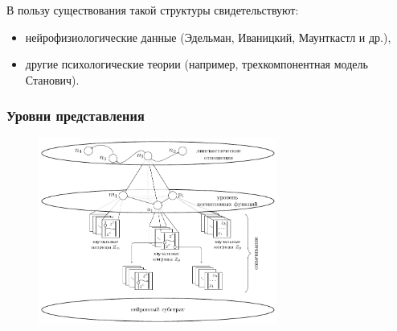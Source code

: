 \documentclass[default]{beamer}
\begin{document}
\begin{frame}
		{\footnotesize
		В пользу существования такой структуры свидетельствуют:
		\begin{itemize}
			\item нейрофизиологические данные (Эдельман, Иваницкий, Маунткастл и др.),
			\item другие психологические теории (например, трехкомпонентная модель Станович).
		\end{itemize}
		}
		\vspace{-5pt}
		\nocite{*}
		\printbibliography[keyword={sign}, resetnumbers=true]
	\end{frame}

	\begin{frame}
		\frametitle{Уровни представления}
		
		\begin{figure}
			\includegraphics[width=0.7\textwidth]{signs/sign_levels}
		\end{figure}
	\end{frame}
	
\end{document}
